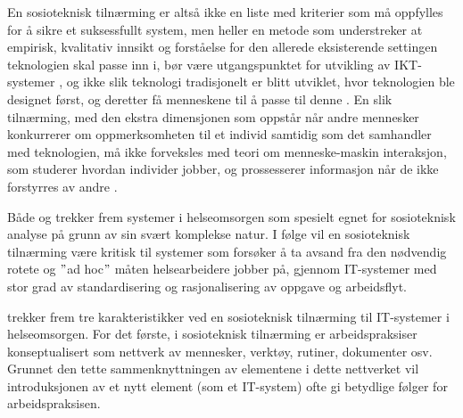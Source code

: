 \noindent
En sosioteknisk tilnærming er altså ikke en liste med kriterier som må oppfylles for å sikre et suksessfullt system, men heller en metode som understreker at empirisk, kvalitativ innsikt og forståelse for den allerede eksisterende settingen teknologien skal passe inn i, bør være utgangspunktet for utvikling av IKT-systemer \citep{Berg99}, og ikke slik teknologi tradisjonelt er blitt utviklet, hvor teknologien ble designet først, og deretter få menneskene til å passe til denne \citep{Appelbaum97}. En slik tilnærming, med den ekstra dimensjonen som oppstår når andre mennesker konkurrerer om oppmerksomheten til et individ samtidig som det samhandler med teknologien, må ikke forveksles med teori om menneske-maskin interaksjon, som studerer hvordan individer jobber, og prossesserer informasjon når de ikke forstyrres av andre \citep{Coiera07}.

\noindent
Både \citet{Coiera07} og \citet{Berg99} trekker frem systemer i helseomsorgen som spesielt egnet for sosioteknisk analyse på grunn av sin svært komplekse natur. I følge \citet{Berg99} vil en sosioteknisk tilnærming være kritisk til systemer som forsøker å ta avsand fra den nødvendig rotete og $"$ad hoc$"$ måten helsearbeidere jobber på, gjennom IT-systemer med stor grad av standardisering og rasjonalisering av oppgave og arbeidsflyt.











\citet{Berg99} trekker frem tre karakteristikker ved en sosioteknisk tilnærming til IT-systemer i helseomsorgen. For det første, i sosioteknisk tilnærming er arbeidspraksiser konseptualisert som nettverk av mennesker, verktøy, rutiner, dokumenter osv. Grunnet den tette sammenknyttningen av elementene i dette nettverket vil introduksjonen av et nytt element (som et IT-system) ofte gi betydlige følger for arbeidspraksisen. 






